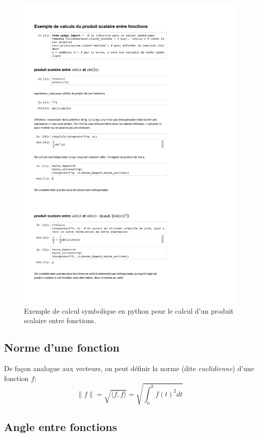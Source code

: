 \begin{figure}
\includegraphics[scale=0.7]{fourier-notebook-polytech.pdf}
\caption{Exemple de calcul symbolique en python pour le calcul d'un produit scalaire entre fonctions.}
\end{figure}

\subsection{Norme d'une fonction}


De façon analogue aux vecteurs, on peut définir la norme (dite \emph{euclidienne}) d'une fonction $f$:
\begin{equation}
\|f\|= \sqrt{\langle f, f \rangle}=\sqrt{\int_a^b f(t)^2dt}
\end{equation} 

\subsection{Angle entre fonctions}



